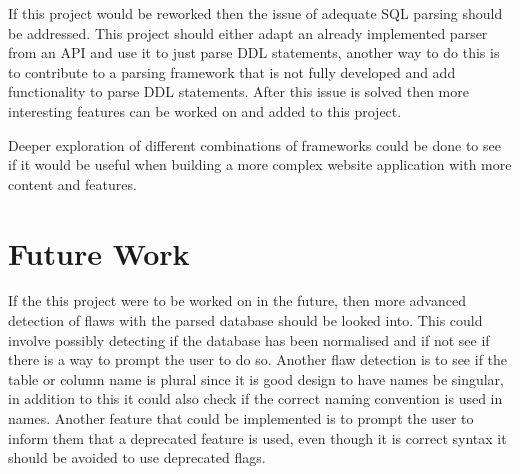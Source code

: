 If this project would be reworked then the issue of adequate SQL parsing should be addressed. This project should either adapt an already implemented parser from an API and use it to just parse DDL statements, another way to do this is to contribute to a parsing framework that is not fully developed and add functionality to parse DDL statements. After this issue is solved then more interesting features can be worked on and added to this project.

Deeper exploration of different combinations of frameworks could be done to see if it would be useful when building a more complex website application with more content and features. 


\section{Future Work}

If the this project were to be worked on in the future, then more advanced detection of flaws with the parsed database should be looked into. This could involve possibly detecting if the database has been normalised and if not see if there is a way to prompt the user to do so. Another flaw detection is to see if the table or column name is plural since it is good design to have names be singular, in addition to this it could also check if the correct naming convention is used in names. Another feature that could be implemented is to prompt the user to inform them that a deprecated feature is used, even though it is correct syntax it should be avoided to use deprecated flags.

